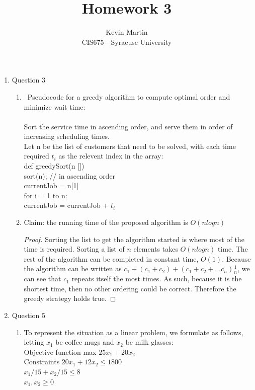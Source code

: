\documentclass{article}
\author{Kevin Martin\\ CIS675 - Syracuse University}
\title{Homework 3}
\newcommand\tab[1][1cm]{\hspace*{#1}}
\begin{document}
\maketitle
\begin{enumerate}
    \item Question 3
      \begin{enumerate}
    \item \ Pseudocode for a greedy algorithm to compute optimal order and minimize wait time:\\\\
      Sort the service time in ascending order, and serve them in order of increasing scheduling
            times. \\
            Let n be the list of customers that need to be solved, with each time required $t_{i}$
            as the relevent index in the array:\\
      
      def greedySort(n [])\\
      sort(n); // in ascending order\\
      currentJob = n[1]\\
      for i = 1 to n:\\
          \tab currentJob = currentJob + $t_{i}$

             
    \item Claim: the running time of the proposed algorithm is $O(n logn)$
      \begin{proof}
      Sorting the list to get the algorithm started is where most of the time is required. Sorting a
        list of $n$ elements takes $O(nlogn)$ time. The rest of the algorithm can be completed in constant
        time, $O(1)$. Because the algorithm can be written as $c_{1}+(c_{1}+c_{2})+(c_{1}+c_{2}+...c_{n})
        \frac 1 n$, we can see that $c_{1}$ repeats itself the most times. As such, because it is the shortest
        time, then no other ordering could be correct. Therefore the greedy strategy holds true.

      \end{proof}

  \end{enumerate}
    \item Question 5
      \begin{enumerate}
        \item To represent the situation as a linear problem, we formulate as follows, letting 
          $x_{1}$ be coffee mugs and $x_{2}$ be milk glasses:\\
          \tab Objective function \tab max $25x_{1}+20x_{2}$  \\
          \tab Constraints \tab \tab $20x_{1}+12x_{2} \leq 1800$  \\
          \tab \tab \tab \tab \tab $x_{1}/15+x_{2}/15 \leq 8$\\
          \tab \tab \tab \tab \tab $x_{1},x_{2} \geq 0$\\



\end{enumerate}
\end{enumerate}
\end{document}
